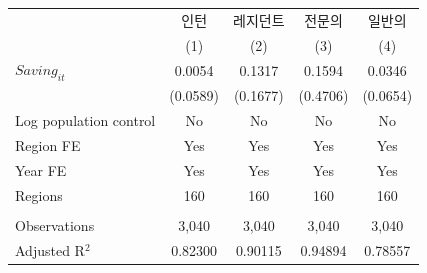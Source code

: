 \begingroup
\centering
\begin{tabular}{lcccc}
   \toprule
                          & 인턴     & 레지던트 & 전문의   & 일반의 \\   
                          & (1)      & (2)      & (3)      & (4)\\  
   \midrule 
   $Saving_{it}$          & 0.0054   & 0.1317   & 0.1594   & 0.0346\\   
                          & (0.0589) & (0.1677) & (0.4706) & (0.0654)\\   
   Log population control & No       & No       & No       & No\\  
   Region FE              & Yes      & Yes      & Yes      & Yes\\  
   Year FE                & Yes      & Yes      & Yes      & Yes\\  
   Regions                & 160      & 160      & 160      & 160\\  
    \\
   Observations           & 3,040    & 3,040    & 3,040    & 3,040\\  
   Adjusted R$^2$         & 0.82300  & 0.90115  & 0.94894  & 0.78557\\  
   \bottomrule
\end{tabular}
\par\endgroup
